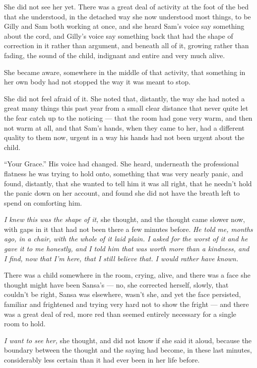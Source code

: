 She did not see her yet. There was a great deal of activity at the foot of the bed that she understood, in the detached way she now understood most things, to be Gilly and Sam both working at once, and she heard Sam’s voice say something about the cord, and Gilly’s voice say something back that had the shape of correction in it rather than argument, and beneath all of it, growing rather than fading, the sound of the child, indignant and entire and very much alive.

She became aware, somewhere in the middle of that activity, that something in her own body had not stopped the way it was meant to stop.

\sceneBreak

She did not feel afraid of it. She noted that, distantly, the way she had noted a great many things this past year from a small clear distance that never quite let the fear catch up to the noticing — that the room had gone very warm, and then not warm at all, and that Sam’s hands, when they came to her, had a different quality to them now, urgent in a way his hands had not been urgent about the child.

“Your Grace.” His voice had changed. She heard, underneath the professional flatness he was trying to hold onto, something that was very nearly panic, and found, distantly, that she wanted to tell him it was all right, that he needn’t hold the panic down on her account, and found she did not have the breath left to spend on comforting him.

\textit{I knew this was the shape of it,} she thought, and the thought came slower now, with gaps in it that had not been there a few minutes before. \textit{He told me, months ago, in a chair, with the whole of it laid plain. I asked for the worst of it and he gave it to me honestly, and I told him that was worth more than a kindness, and I find, now that I’m here, that I still believe that. I would rather have known.}

\sceneBreak

There was a child somewhere in the room, crying, alive, and there was a face she thought might have been Sansa’s — no, she corrected herself, slowly, that couldn’t be right, Sansa was elsewhere, wasn’t she, and yet the face persisted, familiar and frightened and trying very hard not to show the fright — and there was a great deal of red, more red than seemed entirely necessary for a single room to hold.

\textit{I want to see her,} she thought, and did not know if she said it aloud, because the boundary between the thought and the saying had become, in these last minutes, considerably less certain than it had ever been in her life before.

